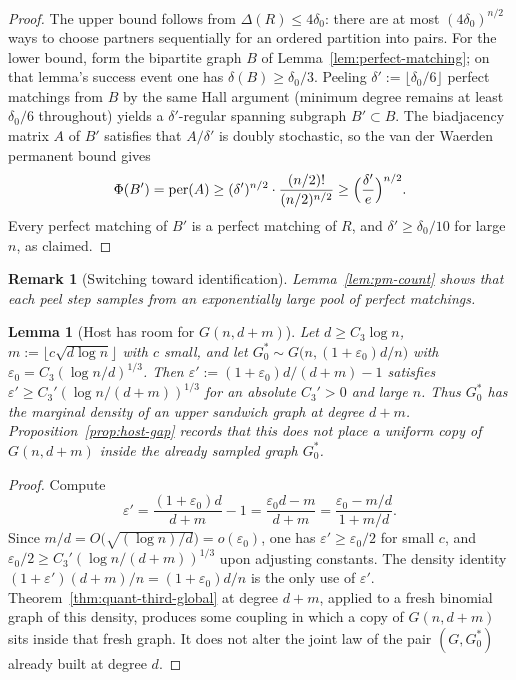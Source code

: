 \documentclass[11pt]{article}
\newtheorem{lemma}[theorem]{Lemma}
\newtheorem{remark}[theorem]{Remark}
\begin{document}
\begin{proof}
The upper bound follows from \(\Delta(R)\le 4\delta_0\): there are at most
\((4\delta_0)^{n/2}\) ways to choose partners sequentially for an ordered
partition into pairs.
For the lower bound, form the bipartite graph \(B\) of
Lemma~\ref{lem:perfect-matching}; on that lemma's success event one has
\(\delta(B)\ge\delta_0/3\).
Peeling \(\delta':=\lfloor\delta_0/6\rfloor\) perfect matchings from \(B\) by the same
Hall argument (minimum degree remains at least \(\delta_0/6\) throughout) yields a
\(\delta'\)-regular spanning subgraph \(B'\subset B\).
The biadjacency matrix \(A\) of \(B'\) satisfies that \(A/\delta'\) is doubly
stochastic, so the van der Waerden permanent bound gives
\[
\Phi(B')
=\mathrm{per}(A)
\ge(\delta')^{n/2}\cdot\frac{(n/2)!}{(n/2)^{n/2}}
\ge\Bigl(\frac{\delta'}{e}\Bigr)^{n/2}.
\]
Every perfect matching of \(B'\) is a perfect matching of \(R\), and
\(\delta'\ge\delta_0/10\) for large \(n\), as claimed.
\end{proof}

\begin{remark}[Switching toward identification]
\label{rem:switching}
Lemma~\ref{lem:pm-count} shows that each peel step samples from an
exponentially large pool of perfect matchings.
\end{remark}

\begin{lemma}[Host has room for \(G(n,d+m)\)]
\label{lem:host-room}
Let \(d\ge C_3\log n\), \(m:=\lfloor c\sqrt{d\log n}\rfloor\) with \(c\) small, and let
\(G^*_0\sim G\bigl(n,(1+\varepsilon_0)d/n\bigr)\) with \(\varepsilon_0=C_3(\log n/d)^{1/3}\).
Then \(\varepsilon':=(1+\varepsilon_0)d/(d+m)-1\) satisfies
\(\varepsilon'\ge C_3'(\log n/(d+m))^{1/3}\) for an absolute \(C_3'>0\) and large \(n\).
Thus \(G^*_0\) has the marginal density of an upper sandwich graph at degree \(d+m\).
Proposition~\ref{prop:host-gap} records that this does not place a uniform copy of
\(G(n,d+m)\) inside the already sampled graph \(G^*_0\).
\end{lemma}

\begin{proof}
Compute
\[
\varepsilon'
=\frac{(1+\varepsilon_0)d}{d+m}-1
=\frac{\varepsilon_0 d-m}{d+m}
=\frac{\varepsilon_0-m/d}{1+m/d}.
\]
Since \(m/d=O\bigl(\sqrt{(\log n)/d}\bigr)=o(\varepsilon_0)\), one has
\(\varepsilon'\ge\varepsilon_0/2\) for small \(c\), and
\(\varepsilon_0/2\ge C_3'(\log n/(d+m))^{1/3}\) upon adjusting constants.
The density identity \((1+\varepsilon')(d+m)/n=(1+\varepsilon_0)d/n\) is the only use of
\(\varepsilon'\). Theorem~\ref{thm:quant-third-global} at degree \(d+m\), applied to a
fresh binomial graph of this density, produces some coupling in which a copy of
\(G(n,d+m)\) sits inside that fresh graph. It does not alter the joint law of the
pair \((G,G^*_0)\) already built at degree \(d\).
\end{proof}
\end{document}
